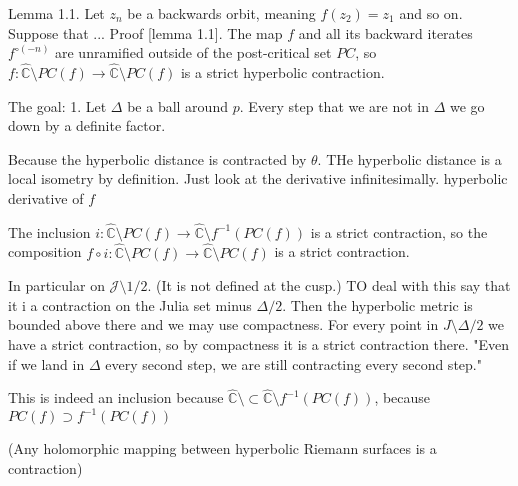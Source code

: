 


	
Lemma 1.1. Let $z_n$	 be a backwards orbit, meaning $f(z_2)=z_1$ and so on. Suppose that ...
Proof [lemma 1.1]. The map $f$ and all its backward iterates $f^ {\circ (-n)}$ are unramified outside of the post-critical set $PC$, so
$f: \hat{\mathbb C} \setminus PC(f) \to \hat{\mathbb C} \setminus PC(f)$ is a strict hyperbolic contraction.

	
The goal: 
1. 
Let $\Delta$ be a ball around $p$.
Every step that we are not in $\Delta$ we go down by a definite factor.

Because the hyperbolic distance is contracted by $\theta$.
THe hyperbolic distance is a local isometry by definition.
Just look at the derivative infinitesimally.
hyperbolic derivative of $f$

The inclusion $i: \hat{\mathbb C} \setminus PC(f) \to \hat{\mathbb C} \setminus f^{-1}(PC(f))$ is a strict contraction, so the composition $ f \circ i: \hat{\mathbb C} \setminus PC(f) \to \hat{\mathbb C} \setminus PC(f)$ is a strict contraction. 

In particular on $\mathcal J \setminus 1/2$. (It is not defined at the cusp.)
TO deal with this say that it i a contraction on the Julia set minus $\Delta /2$. Then the hyperbolic metric is bounded above there and we may use compactness. For every point in $J \setminus \Delta/2$ we have a strict contraction, so by compactness it is a strict contraction there.
"Even if we land in $\Delta$ every second step, we are still contracting every second step."

This is indeed an inclusion because $ \hat{\mathbb C} \setminus   \subset \hat{\mathbb C} \setminus f^{-1}(PC(f)) $, because 
$ PC(f) \supset f^{-1}(PC(f)) $

(Any holomorphic mapping between hyperbolic Riemann surfaces is a contraction)
